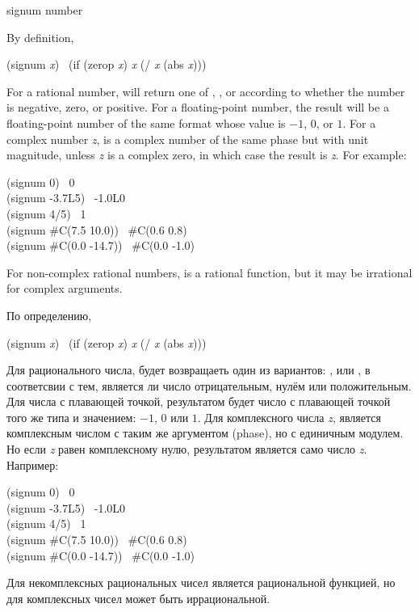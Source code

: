 \begin{defun}[Function]
signum number

By definition,
\begin{lisp}
(signum \emph{x}) \EQ\ (if (zerop \emph{x}) \emph{x} (/ \emph{x} (abs \emph{x})))
\end{lisp}
For a rational number,  will return one of , , or 
according to whether the number is negative, zero, or positive.
For a floating-point number, the result will be a floating-point number
of the same format whose value is $-1$, $0$, or $1$.
For a complex number \emph{z},  is a complex number of
the same phase but with unit magnitude, unless \emph{z} is a complex zero,
in which case the result is \emph{z}.
For example:
\begin{lisp}
(signum 0) \EV\ 0 \\
(signum -3.7L5) \EV\ -1.0L0 \\
(signum 4/5) \EV\ 1 \\
(signum \#C(7.5 10.0)) \EV\ \#C(0.6 0.8) \\
(signum \#C(0.0 -14.7)) \EV\ \#C(0.0 -1.0)
\end{lisp}
For non-complex rational numbers,  is a rational function,
but it may be irrational for complex arguments.

По определению,
\begin{lisp}
(signum \emph{x}) \EQ\ (if (zerop \emph{x}) \emph{x} (/ \emph{x} (abs \emph{x})))
\end{lisp}
Для рационального числа,  будет возвращаеть один из вариантов:
,  или , в соответсвии с тем, является ли число
отрицательным, нулём или положительным.
Для числа с плавающей точкой, результатом будет число с плавающей точкой того же
типа и значением: $-1$, $0$ или $1$.
Для комплексного числа \emph{z},  является комплексным
числом с таким же аргументом (phase), но с единичным модулем. Но если \emph{z}
равен комплексному нулю, результатом является само число \emph{z}.
Например:
\begin{lisp}
(signum 0) \EV\ 0 \\
(signum -3.7L5) \EV\ -1.0L0 \\
(signum 4/5) \EV\ 1 \\
(signum \#C(7.5 10.0)) \EV\ \#C(0.6 0.8) \\
(signum \#C(0.0 -14.7)) \EV\ \#C(0.0 -1.0)
\end{lisp}
Для некомплексных рациональных чисел  является рациональной
функцией, но для комплексных чисел может быть иррациональной.
\end{defun}

